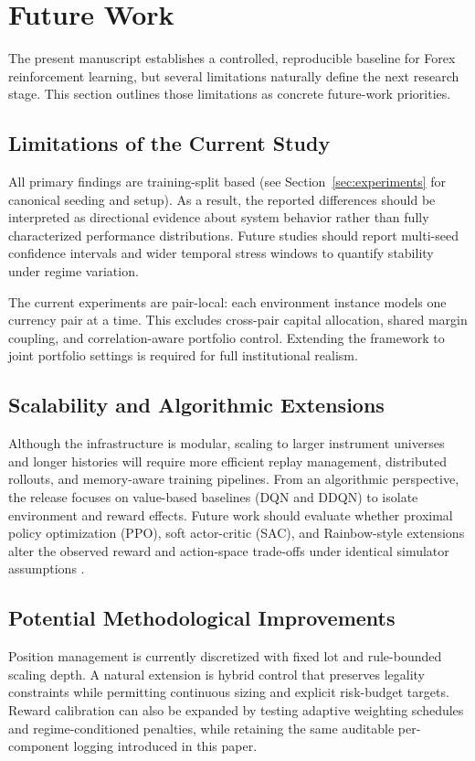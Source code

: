 \section{Future Work}
\label{sec:future_work}

The present manuscript establishes a controlled, reproducible baseline for Forex reinforcement learning, but several limitations naturally define the next research stage. This section outlines those limitations as concrete future-work priorities.

\subsection{Limitations of the Current Study}
All primary findings are training-split based (see Section~\ref{sec:experiments} for canonical seeding and setup). As a result, the reported differences should be interpreted as directional evidence about system behavior rather than fully characterized performance distributions. Future studies should report multi-seed confidence intervals and wider temporal stress windows to quantify stability under regime variation.

The current experiments are pair-local: each environment instance models one currency pair at a time. This excludes cross-pair capital allocation, shared margin coupling, and correlation-aware portfolio control. Extending the framework to joint portfolio settings is required for full institutional realism.

\subsection{Scalability and Algorithmic Extensions}
Although the infrastructure is modular, scaling to larger instrument universes and longer histories will require more efficient replay management, distributed rollouts, and memory-aware training pipelines. From an algorithmic perspective, the release focuses on value-based baselines (DQN and DDQN) to isolate environment and reward effects. Future work should evaluate whether proximal policy optimization (PPO), soft actor-critic (SAC), and Rainbow-style extensions alter the observed reward and action-space trade-offs under identical simulator assumptions \citep{schulman2017proximal,haarnoja2018soft,hessel2018rainbow}.

\subsection{Potential Methodological Improvements}
Position management is currently discretized with fixed lot and rule-bounded scaling depth. A natural extension is hybrid control that preserves legality constraints while permitting continuous sizing and explicit risk-budget targets. Reward calibration can also be expanded by testing adaptive weighting schedules and regime-conditioned penalties, while retaining the same auditable per-component logging introduced in this paper.

